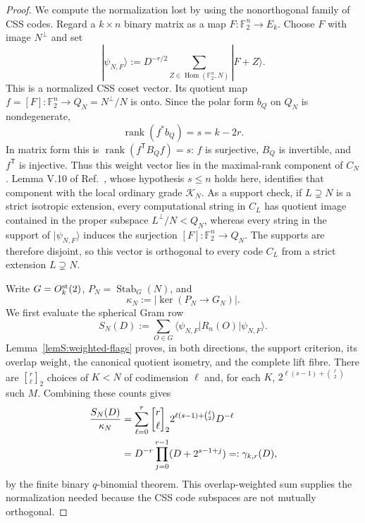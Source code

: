 \documentclass[journal,twocolumn]{IEEEtran}
\theoremstyle{definition}
\theoremstyle{plain}
\newcommand{\F}{\mathbb F}
\newcommand{\rank}{\operatorname{rank}}
\newcommand{\gbinom}[3]{\genfrac{[}{]}{0pt}{}{#1}{#2}_{#3}}
\begin{document}
\begin{proof}
We compute the normalization lost by using the nonorthogonal family of CSS
codes.  Regard a $k\times n$ binary matrix as a map
$F:\F_2^n\to E_k$.  Choose $F$ with image $N^\perp$ and set
\begin{equation}
 |\psi_{N,F}\rangle
 :=D^{-r/2}\sum_{Z\in\operatorname{Hom}(\F_2^n,N)}|F+Z\rangle.
 \label{eqS:max-rank-coset}
\end{equation}
This is a normalized CSS coset vector.  Its quotient map
$f=[F]:\F_2^n\to Q_N=N^\perp/N$ is onto.  Since the polar form $b_Q$
on $Q_N$ is nondegenerate,
\begin{equation}
 \rank(f^*b_Q)=s=k-2r.
 \label{eqS:surjective-weight-rank}
\end{equation}
In matrix form this is $\rank(f^{\mathsf T}B_Qf)=s$: $f$ is surjective,
$B_Q$ is invertible, and $f^{\mathsf T}$ is injective.  Thus this weight
vector lies in the maximal-rank component of $C_N$.  Lemma V.10 of
Ref.~\cite{MontealegreGross2025}, whose hypothesis $s\leq n$ holds here,
identifies that component with the local ordinary grade $\mathcal K_N$.
As a support check, if $L\supsetneq N$ is a
strict isotropic extension, every computational string in $C_L$ has
quotient image contained in the proper subspace $L^\perp/N<Q_N$, whereas
every string in the support of $|\psi_{N,F}\rangle$ induces the surjection
$[F]:\F_2^n\to Q_N$.  The supports are therefore disjoint, so this vector
is orthogonal to every code $C_L$ from a strict extension $L\supsetneq N$.

Write $G=O_k^{\rm st}(2)$, $P_N=\operatorname{Stab}_G(N)$, and
\begin{equation}
 \kappa_N:=|\ker(P_N\longrightarrow G_N)|.
 \label{eqS:kappa}
\end{equation}
We first evaluate the spherical Gram row
\begin{equation}
 S_N(D):=\sum_{O\in G}
 \langle\psi_{N,F}|R_n(O)|\psi_{N,F}\rangle.
 \label{eqS:spherical-row}
\end{equation}
Lemma~\ref{lemS:weighted-flags} proves, in both directions, the support
criterion, its overlap weight, the canonical quotient isometry, and the
complete lift fibre.  There are $\gbinom{r}{\ell}{2}$ choices of
$K<N$ of codimension $\ell$ and, for each $K$,
$2^{\ell(s-1)+\binom\ell2}$ such $M$.  Combining these counts gives
\begin{align}
 \frac{S_N(D)}{\kappa_N}
 &=\sum_{\ell=0}^{r}\gbinom{r}{\ell}{2}
   2^{\ell(s-1)+\binom\ell2}D^{-\ell}\notag\\
 &=D^{-r}\prod_{j=0}^{r-1}(D+2^{s-1+j})
 =:\gamma_{k,r}(D),
 \label{eqS:H-qbinomial}
\end{align}
by the finite binary $q$-binomial theorem.  This overlap-weighted sum supplies
the normalization needed because the CSS code subspaces are not mutually
orthogonal.


\end{proof}
\end{document}
